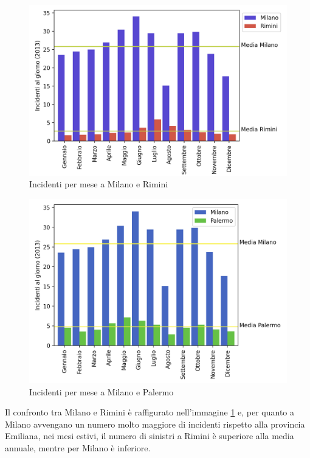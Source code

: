 \documentclass[a4paper]{report}
\begin{document}
\begin{figure}
    \includegraphics[width=\linewidth]{../src/incidenti/incidenti_senza_coords/mese_incidenti/milano_rimini.png}
    \caption{Incidenti per mese a Milano e Rimini}
    \label{fig:milano-rimini}
\end{figure}

\begin{figure}
    \includegraphics[width=\linewidth]{../src/incidenti/incidenti_senza_coords/mese_incidenti/palermo_milano.png}
    \caption{Incidenti per mese a Milano e Palermo}
    \label{fig:palermo-milano}
\end{figure}

Il confronto tra Milano e Rimini è raffigurato nell'immagine \ref{fig:milano-rimini} e, per quanto a 
Milano avvengano un numero molto maggiore di incidenti rispetto alla provincia Emiliana, nei mesi estivi, 
il numero di sinistri a Rimini è superiore alla media annuale, mentre per Milano è inferiore.
\end{document}
